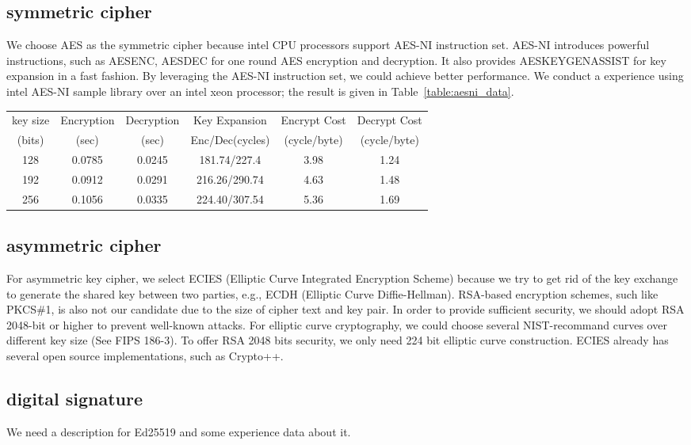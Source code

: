 \subsection{symmetric cipher}
We choose AES as the symmetric cipher because intel CPU processors support
AES-NI instruction set. AES-NI introduces powerful instructions, such as AESENC,
AESDEC for one round AES encryption and decryption. It also provides AESKEYGENASSIST
for key expansion in a fast fashion. By leveraging the AES-NI instruction set, we could
achieve better performance. We conduct a experience using intel AES-NI sample library
over an intel xeon processor; the result is given in Table~\ref{table:aesni_data}.

\begin{table*}[tb]
\centering
\caption{AES performance test over Intel Xeon E5640 Processor. We performed
AES CBC encryption/decryption on a 50MB file over multiple loops, 100 times.}
\label{table:aesni_data}
\begin{tabular}{|c|c|c|c|c|c|} \hline
key size  & Encryption & Decryption& Key Expansion & Encrypt Cost & Decrypt Cost\\ 
(bits)  & (sec) & (sec) & Enc/Dec(cycles) &  (cycle/byte)  & (cycle/byte) \\  \hline
128  &0.0785 & 0.0245 & 181.74/227.4 & 3.98 & 1.24 \\  \hline
192  &0.0912 & 0.0291 & 216.26/290.74 & 4.63 & 1.48 \\  \hline
256  &0.1056 & 0.0335 & 224.40/307.54 & 5.36 & 1.69 \\  \hline
\end{tabular}
\end{table*}

\subsection{asymmetric cipher}
For asymmetric key cipher, we select ECIES (Elliptic Curve Integrated Encryption Scheme)
because we try to get rid of the key exchange to generate the shared key between two parties,
e.g., ECDH (Elliptic Curve Diffie-Hellman). RSA-based encryption schemes, such like PKCS\#1, is
also not our candidate due to the size of cipher text and key pair. In order to provide
sufficient security, we should adopt RSA 2048-bit or higher to prevent well-known attacks.
For elliptic curve cryptography, we could choose several NIST-recommand curves over different
key size (See FIPS 186-3). To offer RSA 2048 bits security, we only need 224 bit elliptic curve
construction. ECIES already has several open source implementations, such as Crypto++.

\subsection{digital signature}
We need a description for Ed25519 and some experience data about it.
